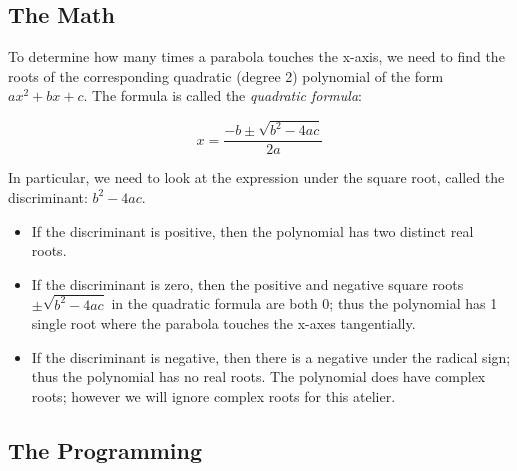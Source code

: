 \subsection{The Math}

To determine how many times a parabola touches the x-axis, we need to
find the roots of the corresponding quadratic (degree 2) polynomial of
the form $a x^2 + b x + c$.  The formula is called the \emph{quadratic
formula}:

\[x = \frac{-b\pm\sqrt{b^2 - 4a c}}{2a}\]

In particular,
we need to look at the expression under the square root, called the
discriminant: $b^2 - 4a c$.
\begin{itemize}
\item If the discriminant is positive, then the polynomial has two
  distinct real roots.
\item If the discriminant is zero, then the positive and negative
  square roots $\pm\sqrt{b^2 - 4a c}$ in the quadratic formula are
  both 0; thus the polynomial has 1 single root where the parabola
  touches the x-axes tangentially.
  
\item If the discriminant is negative, then there is a negative under
  the radical sign; thus the polynomial has no real roots.  The
  polynomial does have complex roots; however we will ignore complex
  roots for this atelier.
\end{itemize}

\subsection{The Programming}

